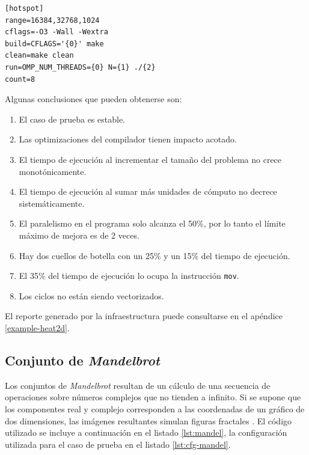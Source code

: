 \documentclass[a4paper]{report}
\begin{document}
\bigskip

\begin{lstlisting}[caption={Caso de Prueba de Distribución de Calor en 2 Dimensiones},label={lst:cfg-heat}]
[hotspot]
range=16384,32768,1024
cflags=-O3 -Wall -Wextra
build=CFLAGS='{0}' make
clean=make clean
run=OMP_NUM_THREADS={0} N={1} ./{2}
count=8
\end{lstlisting}

\bigskip

Algunas conclusiones que pueden obtenerse son:

\begin{enumerate}
\item El caso de prueba es estable.
\item Las optimizaciones del compilador tienen impacto acotado.
\item El tiempo de ejecución al incrementar el tamaño del problema no crece monotónicamente.
\item El tiempo de ejecución al sumar más unidades de cómputo no decrece sistemáticamente.
\item El paralelismo en el programa solo alcanza el 50\%, por lo tanto el límite máximo de mejora es de 2 veces.
\item Hay dos cuellos de botella con un 25\% y un 15\% del tiempo de ejecución.
\item El 35\% del tiempo de ejecución lo ocupa la instrucción {\tt mov}.
\item Los ciclos no están siendo vectorizados.
\end{enumerate}

El reporte generado por la infraestructura puede consultarse en el apéndice \ref{example-heat2d}.

\subsection{Conjunto de {\it Mandelbrot}}

Los conjuntos de {\it Mandelbrot} resultan de un cálculo de una secuencia de operaciones sobre números complejos que no tienden a infinito.
Si se supone que los componentes real y complejo corresponden a las coordenadas de un gráfico de dos dimensiones, las imágenes resultantes simulan figuras fractales \cite{mandel}.
El código utilizado se incluye a continuación en el listado \ref{lst:mandel}, la configuración utilizada para el caso de prueba en el listado \ref{lst:cfg-mandel}.

\bigskip
\end{document}
